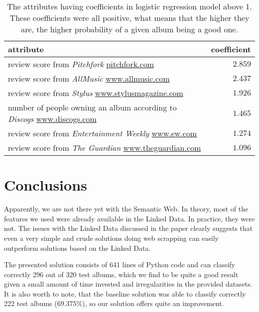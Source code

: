 \documentclass{llncs}
\begin{document}
\begin{table}
\caption{The attributes having coefficients in logistic regression model above 1.
These coefficients were all positive, what means that the higher they are, the higher probability of a given album being a good one.
\label{tab:best_attrs}
}
\begin{tabular}{l|r}
attribute & coefficient \\
\hline
review score from \emph{Pitchfork} \url{pitchfork.com} & $2.859$ \\
review score from \emph{AllMusic} \url{www.allmusic.com} & $2.437$ \\
review score from \emph{Stylus} \url{www.stylusmagazine.com} & $1.926$ \\ %
number of people owning an album according to \emph{Discogs} \url{www.discogs.com} & $1.465$ \\
review score from \emph{Entertainment Weekly} \url{www.ew.com} & $1.274$ \\ %
review score from \emph{The Guardian} \url{www.theguardian.com} & $1.096$ \\ %
\end{tabular}
\end{table}

\section{Conclusions\label{sec:concl}}

Apparently, we are not there yet with the Semantic Web.
In theory, most of the features we used were already available in the Linked Data.
In practice, they were not.
The issues with the Linked Data discussed in the paper clearly suggests that even a very simple and crude solutions doing web scrapping can easily outperform solutions based on the Linked Data.

The presented solution consists of 641 lines of Python code and can classify correctly 296 out of 320 test albums, which we find to be quite a good result given a small amount of time invested and irregularities in the provided datasets.
It is also worth to note, that the baseline solution was able to classify correctly 222 test albums ($69.375\%$), so our solution offers quite an improvement.



\end{document}
